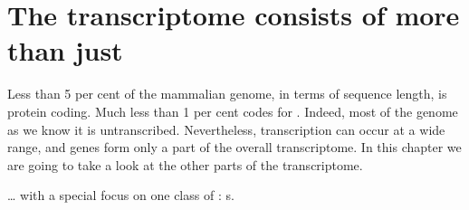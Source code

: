 \chapter{The  transcriptome consists of more than just }

Less than \num{5} per cent of the mammalian genome, in terms of sequence length,
is protein coding. Much less than \num{1} per cent codes for \trna[s]. Indeed,
most of the genome as we know it is untranscribed\todo[ref]{}. Nevertheless,
 transcription can occur at a wide range, and \trna genes form only a part
of the overall  transcriptome. In this chapter we are going to take a look
at the other parts of the  transcriptome.


… with a special focus on one class
of : s.

